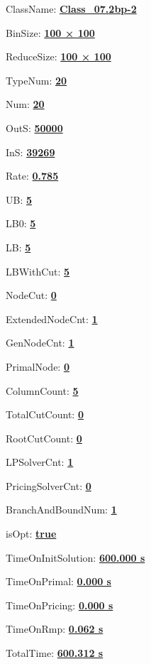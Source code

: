 \documentclass[11pt]{article}
\begin{document}
\pagestyle{empty}


ClassName: \underline{\textbf{Class_07.2bp-2}}
\par
BinSize: \underline{\textbf{100 × 100}}
\par
ReduceSize: \underline{\textbf{100 × 100}}
\par
TypeNum: \underline{\textbf{20}}
\par
Num: \underline{\textbf{20}}
\par
OutS: \underline{\textbf{50000}}
\par
InS: \underline{\textbf{39269}}
\par
Rate: \underline{\textbf{0.785}}
\par
UB: \underline{\textbf{5}}
\par
LB0: \underline{\textbf{5}}
\par
LB: \underline{\textbf{5}}
\par
LBWithCut: \underline{\textbf{5}}
\par
NodeCut: \underline{\textbf{0}}
\par
ExtendedNodeCnt: \underline{\textbf{1}}
\par
GenNodeCnt: \underline{\textbf{1}}
\par
PrimalNode: \underline{\textbf{0}}
\par
ColumnCount: \underline{\textbf{5}}
\par
TotalCutCount: \underline{\textbf{0}}
\par
RootCutCount: \underline{\textbf{0}}
\par
LPSolverCnt: \underline{\textbf{1}}
\par
PricingSolverCnt: \underline{\textbf{0}}
\par
BranchAndBoundNum: \underline{\textbf{1}}
\par
isOpt: \underline{\textbf{true}}
\par
TimeOnInitSolution: \underline{\textbf{600.000 s}}
\par
TimeOnPrimal: \underline{\textbf{0.000 s}}
\par
TimeOnPricing: \underline{\textbf{0.000 s}}
\par
TimeOnRmp: \underline{\textbf{0.062 s}}
\par
TotalTime: \underline{\textbf{600.312 s}}
\par
\newpage


\end{document}
